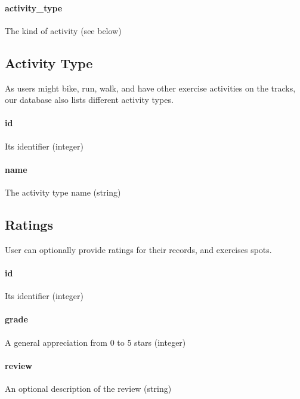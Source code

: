\documentclass[a4paper]{article}
\begin{document}
\paragraph{activity\_type} The kind of activity (see below)


\subsection{Activity Type}
As users might bike, run, walk, and have other exercise activities on the tracks,
our database also lists different activity types.

\paragraph{id} Its identifier (integer)
\paragraph{name} The activity type name (string)


\subsection{Ratings}
User can optionally provide ratings for their records, and exercises spots.

\paragraph{id} Its identifier (integer)
\paragraph{grade} A general appreciation from 0 to 5 stars (integer)
\paragraph{review} An optional description of the review (string)
\end{document}

